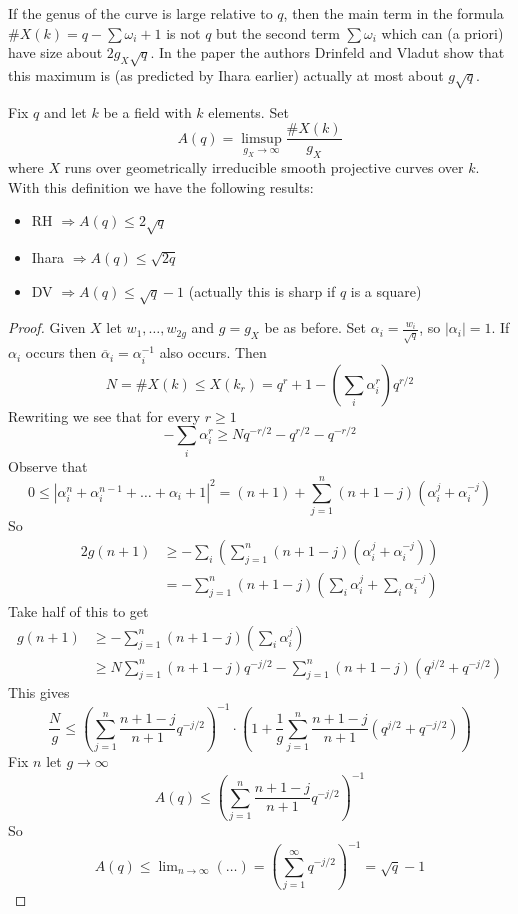 \documentclass{stacks-project}
\theoremstyle{plain}
\theoremstyle{definition}
\theoremstyle{remark}
\numberwithin{equation}{subsection}
\def\lim{\mathop{\mathrm{lim}}\nolimits}
\begin{document}
\noindent
If the genus of the curve is large relative to $q$, then the main
term in the formula $\# X(k) = q - \sum \omega_i + 1$ is not $q$
but the second term $\sum \omega_i$ which can (a priori) have
size about $2g_X\sqrt{q}$. In the paper \cite{Drinfeld-number}
the authors Drinfeld and Vladut show that this maximum is (as predicted
by Ihara earlier) actually at most about $g\sqrt{q}$.

\medskip\noindent
Fix $q$ and let $k$ be a field with $k$ elements. Set
$$
A(q) = \limsup_{g_X \to \infty} \frac{\# X(k)}{g_X}
$$
where $X$ runs over geometrically irreducible smooth projective
curves over $k$. With this definition we have the following results:
\begin{itemize}
\item RH $\Rightarrow A(q)\leq 2\sqrt{q}$
\item Ihara $\Rightarrow A(q)\leq \sqrt{2q}$
\item DV $\Rightarrow A(q)\leq \sqrt{q}-1$ (actually this is sharp if $q$
is a square)
\end{itemize}

\begin{proof}
Given $X$ let $w_1, \ldots, w_{2g}$ and $g = g_X$ be as before. Set
$\alpha_i = \frac{w_i}{\sqrt{q}}$, so $|\alpha_i| = 1$. If $\alpha_i$
occurs then $\overline{\alpha}_i = \alpha_i^{-1}$ also occurs. Then
$$
N = \# X(k) \leq X(k_r) = q^r + 1 - (\sum_i \alpha_i^r) q^{r/2}
$$
Rewriting we see that for every $r \geq 1$
$$
-\sum_i \alpha_i^r \geq Nq^{-r/2} - q^{r/2} - q^{-r/2}
$$
Observe that
$$
0 \leq |\alpha_i^n +\alpha_i^{n-1} +\ldots +\alpha_i +1|^2
= (n + 1) + \sum_{j = 1}^n (n + 1 - j) (\alpha_i^j + \alpha_i^{-j})
$$
So
\begin{align*}
2g(n+1) & \geq - \sum_i \left(\sum_{j = 1}^n (n+1-j)(\alpha_i^j
+\alpha_i^{-j})\right)\\
& =-\sum_{j = 1}^n (n+1-j)\left(\sum_i\alpha_i^j
+\sum_i\alpha_i^{-j}\right)
\end{align*}
Take half of this to get
\begin{align*}
g(n+1)& \geq - \sum_{j = 1}^n (n+1-j)(\sum_i\alpha_i^j)\\
& \geq N\sum_{j = 1}^n (n+1-j)q^{-j/2}-\sum_{j = 1}^n
(n+1-j)(q^{j/2}+q^{-j/2})
\end{align*}
This gives
$$
\frac{N}{g}\leq \left(\sum_{j = 1}^n \frac{n+1-j}{n+1}q^{-j/2} \right)^{-1}
\cdot
\left(
1 + \frac{1}{g} \sum_{j = 1}^n \frac{n + 1 - j}{n + 1}(q^{j/2} + q^{-j/2})
\right)
$$
Fix $n$ let $g\to \infty$
$$
A(q)\leq \left(\sum_{j = 1}^n \frac{n+1-j}{n+1}q^{-j/2}\right)^{-1}
$$
So
$$
A(q)\leq \lim_{n\to\infty}(\ldots) = \left(\sum_{j = 1}^\infty
q^{-j/2}\right)^{-1}=\sqrt{q}-1
$$
\end{proof}









\end{document}
